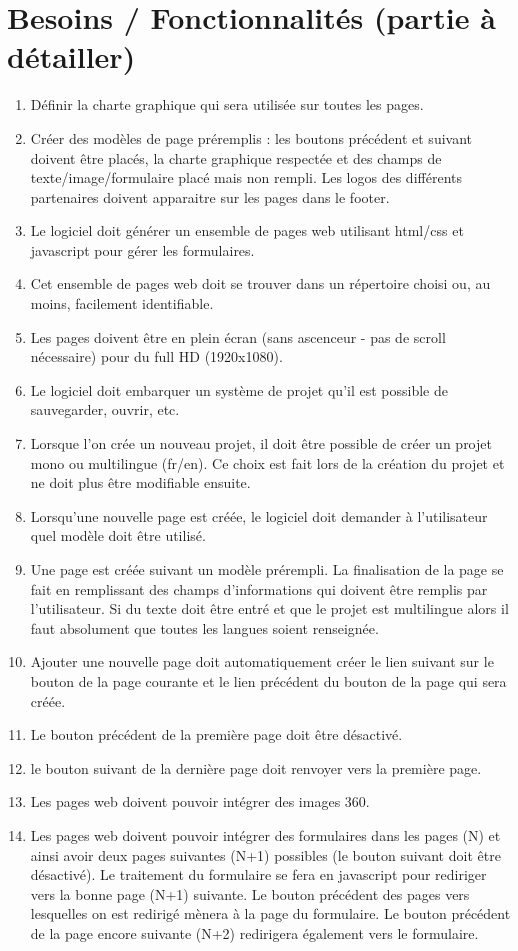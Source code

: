 \documentclass[11pt]{article}
\begin{document}
\section{Besoins / Fonctionnalités (partie à détailler)}
\begin{enumerate}
\item Définir la charte graphique qui sera utilisée sur toutes les pages.
\item Créer des modèles de page préremplis : les boutons précédent et suivant doivent être placés, la charte graphique respectée et des champs de texte/image/formulaire placé mais non rempli. Les logos des différents partenaires doivent apparaitre sur les pages dans le footer.
\item Le logiciel doit générer un ensemble de pages web utilisant html/css et javascript pour gérer les formulaires.
\item Cet ensemble de pages web doit se trouver dans un répertoire choisi ou, au moins, facilement identifiable.
\item Les pages doivent être en plein écran (sans ascenceur - pas de scroll nécessaire) pour du full HD (1920x1080).
\item Le logiciel doit embarquer un système de projet qu'il est possible de sauvegarder, ouvrir, etc.
\item Lorsque l'on crée un nouveau projet, il doit être possible de créer un projet mono ou multilingue (fr/en). Ce choix est fait lors de la création du projet et ne doit plus être modifiable ensuite.
\item Lorsqu'une nouvelle page est créée, le logiciel doit demander à l'utilisateur quel modèle doit être utilisé.
\item Une page est créée suivant un modèle prérempli. La finalisation de la page se fait en remplissant des champs d'informations qui doivent être remplis par l'utilisateur. Si du texte doit être entré et que le projet est multilingue alors il faut absolument que toutes les langues soient renseignée.
\item Ajouter une nouvelle page doit automatiquement créer le lien suivant sur le bouton de la page courante et le lien précédent du bouton de la page qui sera créée.
\item Le bouton précédent de la première page doit être désactivé.
\item le bouton suivant de la dernière page doit renvoyer vers la première page.
\item Les pages web doivent pouvoir intégrer des images 360.
\item Les pages web doivent pouvoir intégrer des formulaires dans les pages (N) et ainsi avoir deux pages suivantes (N+1) possibles (le bouton suivant doit être désactivé). Le traitement du formulaire se fera en javascript pour rediriger vers la bonne page (N+1) suivante. Le bouton précédent des pages vers lesquelles on est redirigé mènera à la page du formulaire. Le bouton précédent de la page encore suivante (N+2) redirigera également vers le formulaire.

\end{enumerate}
\end{document}
